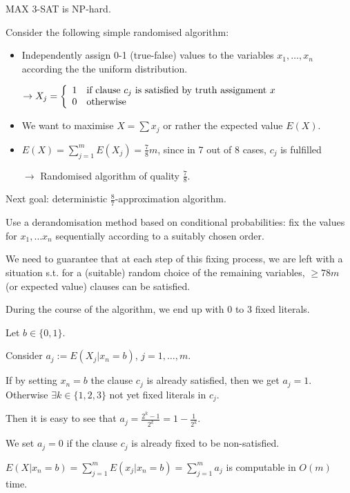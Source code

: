 \documentclass[11pt]{article}
\theoremstyle{definition}
\theoremstyle{definition}
\begin{document}
MAX 3-SAT is NP-hard.

Consider the following simple randomised algorithm:
\begin{itemize}
\item Independently assign 0-1 (true-false) values to the variables $ x_1, \dots, x_n $ according the the uniform distribution.

$ \rightarrow X_j = \left\{ \begin{array}{l l} 1 & \text{if clause $ c_j $ is satisfied by truth assignment } x \\ 0 & \text{otherwise} \end{array} \right. $

\item We want to maximise $ X = \sum x_j $ or rather the expected value $ E(X) $.

\item $ E(X) = \sum \limits_{j = 1}^m E(X_j) = \frac{7}{8} m $, since in 7 out of 8 cases, $ c_j $ is fulfilled %

$ \rightarrow $ Randomised algorithm of quality $ \frac{7}{8} $.
\end{itemize} \medskip

Next goal: deterministic $ \frac{8}{7} $-approximation algorithm.

Use a derandomisation method based on conditional probabilities: fix the values for $ x_1, \dots x_n $ sequentially according to a suitably chosen order.

We need to guarantee that at each step of this fixing process, we are left with a situation s.t. for a (suitable) random choice of the remaining variables, $ \geq {7}{8}m $ (or expected value) clauses can be satisfied.

During the course of the algorithm, we end up with 0 to 3 fixed literals.

Let $ b \in \{0, 1\} $.

Consider $ a_j := E(X_j | x_n = b ) $, $ j = 1, \dots, m $.

If by setting $ x_n = b $ the clause $ c_j $ is already satisfied, then we get $ a_j = 1 $. Otherwise $ \exists k \in \{1, 2, 3\} $ not yet fixed literals in $ c_j $.

Then it is easy to see that $ a_j = \frac{2^k - 1}{2^k} = 1 - \frac{1}{2^k} $.

We set $ a_j = 0 $ if the clause $ c_j $ is already fixed to be non-satisfied.

$ E (X | x_n = b) = \sum \limits_{j = 1}^m E (x_j | x_n = b) = \sum \limits_{j = 1}^m a_j $ is computable in $ O(m) $ time.
\end{document}
